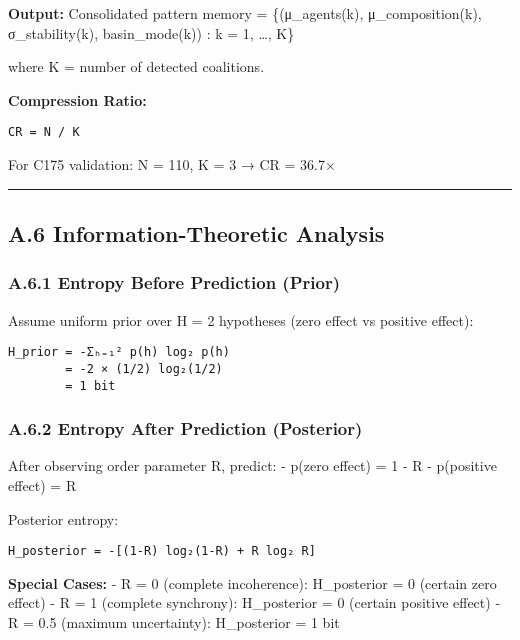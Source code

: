 \documentclass[
]{article}
\begin{document}
\textbf{Output:} Consolidated pattern memory = \{(μ\_agents(k),
μ\_composition(k), σ\_stability(k), basin\_mode(k)) : k = 1, \ldots, K\}

where K = number of detected coalitions.

\textbf{Compression Ratio:}

\begin{verbatim}
CR = N / K
\end{verbatim}

For C175 validation: N = 110, K = 3 → CR = 36.7×

\begin{center}\rule{0.5\linewidth}{0.5pt}\end{center}

\subsection{A.6 Information-Theoretic
Analysis}\label{a.6-information-theoretic-analysis}

\subsubsection{A.6.1 Entropy Before Prediction
(Prior)}\label{a.6.1-entropy-before-prediction-prior}

Assume uniform prior over H = 2 hypotheses (zero effect vs positive
effect):

\begin{verbatim}
H_prior = -Σₕ₌₁² p(h) log₂ p(h)
        = -2 × (1/2) log₂(1/2)
        = 1 bit
\end{verbatim}

\subsubsection{A.6.2 Entropy After Prediction
(Posterior)}\label{a.6.2-entropy-after-prediction-posterior}

After observing order parameter R, predict: - p(zero effect) = 1 - R -
p(positive effect) = R

Posterior entropy:

\begin{verbatim}
H_posterior = -[(1-R) log₂(1-R) + R log₂ R]
\end{verbatim}

\textbf{Special Cases:} - R = 0 (complete incoherence): H\_posterior = 0
(certain zero effect) - R = 1 (complete synchrony): H\_posterior = 0
(certain positive effect) - R = 0.5 (maximum uncertainty): H\_posterior
= 1 bit
\end{document}
